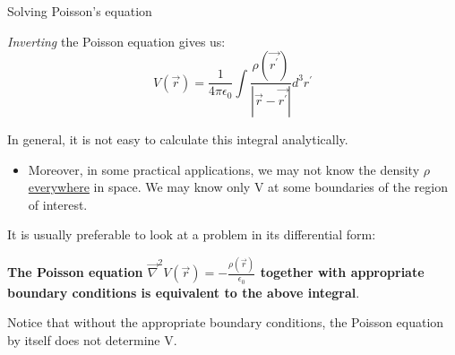 \begin{frame}{Solving Poisson's equation}

{\em Inverting} the Poisson equation gives us:
\begin{equation*}
   V(\vec{r}) = \frac{1}{4\pi\epsilon_0} \int \frac{\rho(\vec{r^{\prime}})}{|\vec{r}-\vec{r^{\prime}}|} d^{3}r^{\prime}
\end{equation*}

In general, it is not easy to calculate this integral analytically.\\
\begin{itemize}
  \item
   Moreover, in some practical applications, we may not know the density $\rho$ \underline{everywhere} in space.
   We may know only V at some boundaries of the region of interest.\\
\end{itemize}
\vspace{0.2cm}

It is usually preferable to look at a problem in its differential form:\\
\vspace{0.2cm}

{\bf
The Poisson equation
$\vec{\nabla}^{2} V(\vec{r}) = -\frac{\rho(\vec{r})}{\epsilon_0}$
together with appropriate boundary conditions is equivalent to the above integral}.\\

\vspace{0.2cm}

Notice that without the appropriate boundary conditions,
the Poisson equation by itself does not determine V.

\end{frame}


%
%
%

